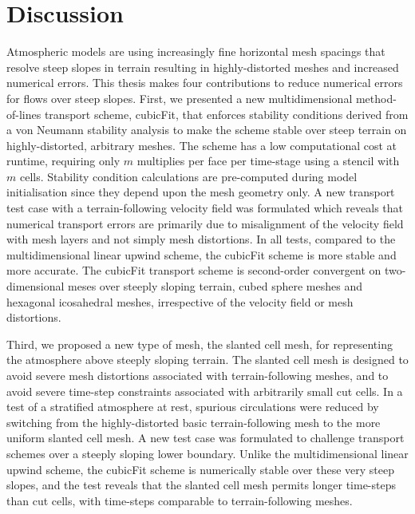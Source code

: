 \chapter{Discussion}
\label{ch:discussion}

Atmospheric models are using increasingly fine horizontal mesh spacings that resolve steep slopes in terrain resulting in highly-distorted meshes and increased numerical errors.
This thesis makes four contributions to reduce numerical errors for flows over steep slopes.
First, we presented a new multidimensional method-of-lines transport scheme, cubicFit, that enforces stability conditions derived from a von Neumann stability analysis to make the scheme stable over steep terrain on highly-distorted, arbitrary meshes.
The scheme has a low computational cost at runtime, requiring only $m$ multiplies per face per time-stage using a stencil with $m$ cells.
Stability condition calculations are pre-computed during model initialisation since they depend upon the mesh geometry only.
A new transport test case with a terrain-following velocity field was formulated which reveals that numerical transport errors are primarily due to misalignment of the velocity field with mesh layers and not simply mesh distortions.
In all tests, compared to the multidimensional linear upwind scheme, the cubicFit scheme is more stable and more accurate.
The cubicFit transport scheme is second-order convergent on two-dimensional meses over steeply sloping terrain, cubed sphere meshes and hexagonal icosahedral meshes, irrespective of the velocity field or mesh distortions.


Third, we proposed a new type of mesh, the slanted cell mesh, for representing the atmosphere above steeply sloping terrain.
The slanted cell mesh is designed to avoid severe mesh distortions associated with terrain-following meshes, and to avoid severe time-step constraints associated with arbitrarily small cut cells.
In a test of a stratified atmosphere at rest, spurious circulations were reduced by switching from the highly-distorted basic terrain-following mesh to the more uniform slanted cell mesh.
A new test case was formulated to challenge transport schemes over a steeply sloping lower boundary.
Unlike the multidimensional linear upwind scheme, the cubicFit scheme is numerically stable over these very steep slopes, and the test reveals that the slanted cell mesh permits longer time-steps than cut cells, with time-steps comparable to terrain-following meshes.

